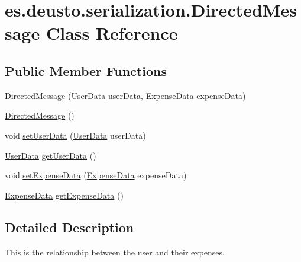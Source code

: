 \hypertarget{classes_1_1deusto_1_1serialization_1_1_directed_message}{}\section{es.\+deusto.\+serialization.\+Directed\+Message Class Reference}
\label{classes_1_1deusto_1_1serialization_1_1_directed_message}
\subsection*{Public Member Functions}
\begin{DoxyCompactItemize}
\item 
\hyperlink{classes_1_1deusto_1_1serialization_1_1_directed_message_a7202c6402fc3820da88d1907d391e2fe}{Directed\+Message} (\hyperlink{classes_1_1deusto_1_1serialization_1_1_user_data}{User\+Data} user\+Data, \hyperlink{classes_1_1deusto_1_1serialization_1_1_expense_data}{Expense\+Data} expense\+Data)
\item 
\hyperlink{classes_1_1deusto_1_1serialization_1_1_directed_message_aa9849ae931af7c774d2e98a15da1a166}{Directed\+Message} ()
\item 
void \hyperlink{classes_1_1deusto_1_1serialization_1_1_directed_message_a4a3f7852410bc29d73179294836e84c4}{set\+User\+Data} (\hyperlink{classes_1_1deusto_1_1serialization_1_1_user_data}{User\+Data} user\+Data)
\item 
\hyperlink{classes_1_1deusto_1_1serialization_1_1_user_data}{User\+Data} \hyperlink{classes_1_1deusto_1_1serialization_1_1_directed_message_a66353c1aa604944db42e4bc569141782}{get\+User\+Data} ()
\item 
void \hyperlink{classes_1_1deusto_1_1serialization_1_1_directed_message_a2f339d3849855fd1fc88cdf6a6c3e2cf}{set\+Expense\+Data} (\hyperlink{classes_1_1deusto_1_1serialization_1_1_expense_data}{Expense\+Data} expense\+Data)
\item 
\hyperlink{classes_1_1deusto_1_1serialization_1_1_expense_data}{Expense\+Data} \hyperlink{classes_1_1deusto_1_1serialization_1_1_directed_message_ad65304c7044bdac65e526dd6f666c1cf}{get\+Expense\+Data} ()
\end{DoxyCompactItemize}


\subsection{Detailed Description}
This is the relationship between the user and their expenses.~\newline



